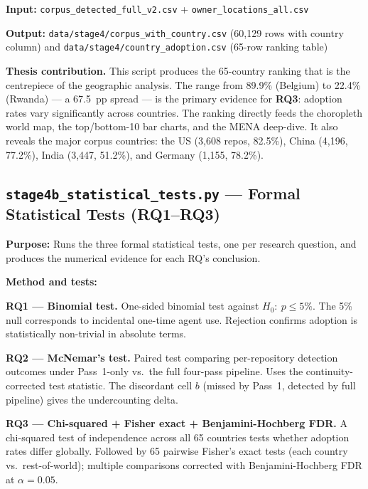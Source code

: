 \documentclass[11pt,a4paper]{article}
\begin{document}
\textbf{Input:} \texttt{corpus\_detected\_full\_v2.csv} + \texttt{owner\_locations\_all.csv}

\textbf{Output:} \texttt{data/stage4/corpus\_with\_country.csv} (60,129 rows with
country column) and \texttt{data/stage4/country\_adoption.csv} (65-row ranking table)

\begin{outputbox}
\textbf{Thesis contribution.}
This script produces the 65-country ranking that is the centrepiece of the
geographic analysis. The range from 89.9\% (Belgium) to 22.4\% (Rwanda)
--- a 67.5~pp spread --- is the primary evidence for \textbf{RQ3}: adoption
rates vary significantly across countries. The ranking directly feeds the
choropleth world map, the top/bottom-10 bar charts, and the MENA deep-dive.
It also reveals the major corpus countries: the US (3,608 repos, 82.5\%),
China (4,196, 77.2\%), India (3,447, 51.2\%), and Germany (1,155, 78.2\%).
\end{outputbox}

\newpage

\subsection*{\texttt{stage4b\_statistical\_tests.py} --- Formal Statistical Tests (RQ1--RQ3)}

\begin{infobox}
\textbf{Purpose:} Runs the three formal statistical tests, one per research
question, and produces the numerical evidence for each RQ's conclusion.
\end{infobox}

\textbf{Method and tests:}

\textbf{RQ1 --- Binomial test.} One-sided binomial test against $H_0{:}\ p \leq 5\%$.
The 5\% null corresponds to incidental one-time agent use. Rejection confirms
adoption is statistically non-trivial in absolute terms.

\textbf{RQ2 --- McNemar's test.} Paired test comparing per-repository detection
outcomes under Pass~1-only vs.\ the full four-pass pipeline. Uses the
continuity-corrected test statistic. The discordant cell $b$ (missed by Pass~1,
detected by full pipeline) gives the undercounting delta.

\textbf{RQ3 --- Chi-squared + Fisher exact + Benjamini-Hochberg FDR.}
A chi-squared test of independence across all 65 countries tests whether
adoption rates differ globally. Followed by 65 pairwise Fisher's exact tests
(each country vs.\ rest-of-world); multiple comparisons corrected with
Benjamini-Hochberg FDR at $\alpha = 0.05$.
\end{document}
